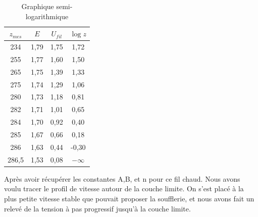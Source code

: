 \documentclass[12pt, a4paper]{report}
\begin{document}
	\begin{table}[h!]
		\begin{minipage}{0.45\textwidth}
			\centering
			\begin{tabular}{|c|c|c|c|}
				\hline
				\textbf{$z_{mes}$} & \textbf{$E$} & \textbf{$U_{fil}$} & \textbf{$\log{z}$} \\ \hline
				234   & 1,79 & 1,75  & 1,72 \\ \hline
				255   & 1,77 & 1,60  & 1,50 \\ \hline
				265   & 1,75 & 1,39  & 1,33 \\ \hline
				275   & 1,74 & 1,29  & 1,06 \\ \hline
				280   & 1,73 & 1,18  & 0,81 \\ \hline
				282   & 1,71 & 1,01  & 0,65 \\ \hline
				284   & 1,70 & 0,92  & 0,40 \\ \hline
				285   & 1,67 & 0,66  & 0,18 \\ \hline
				286   & 1,63 & 0,44  & -0,30 \\ \hline
				286,5 & 1,53 & 0,08  & $-\infty$ \\ %
				\hline
			\end{tabular}
			\caption{Synthèse des mesures ($\log$)}
		\end{minipage}
		\hfill
		\begin{minipage}{0.48\textwidth} %
			\centering
			\caption{Graphique semi-logarithmique}
		\end{minipage}
	\end{table}
	
	Après avoir récupérer les constantes A,B, et n pour ce fil chaud. Nous avons voulu tracer le profil de vitesse autour de la couche limite. On s'est placé à la plus petite vitesse stable que pouvait proposer la soufflerie, et nous avons fait un relevé de la tension à pas progressif jusqu'à la couche limite.\\
	
\end{document}
